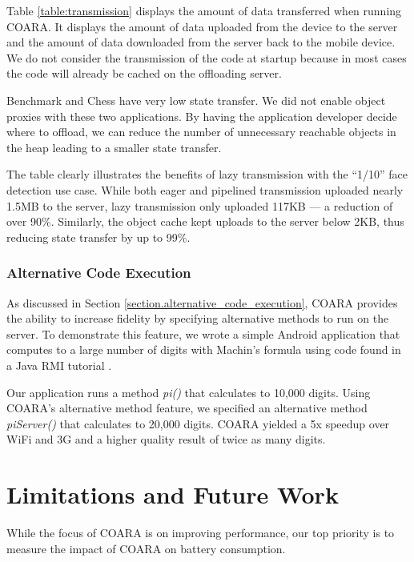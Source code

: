 \documentclass[10pt,journal,cspaper,compsoc]{IEEEtran}
\begin{document}
{Table \ref{table:transmission} displays the amount of data transferred when running COARA.  It displays the amount of data uploaded from the device to the server and the amount of data downloaded from the server back to the mobile device.  We do not consider the transmission of the code at startup because in most cases the code will already be cached on the offloading server.

Benchmark and Chess have very low state transfer.  We did not enable object proxies with these two applications.  By having the application developer decide where to offload, we can reduce the number of unnecessary reachable objects in the heap leading to a smaller state transfer.

The table clearly illustrates the benefits of lazy transmission with the ``1/10'' face detection use case.  While both eager and pipelined transmission uploaded nearly 1.5MB to the server, lazy transmission only uploaded 117KB --- a reduction of over 90\%.  Similarly, the object cache kept uploads to the server below 2KB, thus reducing state transfer by up to 99\%.



\subsubsection{Alternative Code Execution}


As discussed in Section \ref{section.alternative_code_execution}, COARA provides the ability to increase fidelity by specifying alternative methods to run on the server.  To demonstrate this feature, we wrote a simple Android application that computes  to a large number of digits with Machin's formula using code found in a Java RMI tutorial \cite{pi:Online}.

Our application runs a method \emph{pi()} that calculates  to 10,000 digits.  Using COARA's alternative method feature, we specified an alternative method \emph{piServer()} that calculates  to 20,000 digits.  COARA yielded a 5x speedup over WiFi and 3G and a higher quality result of twice as many digits.




\section{Limitations and Future Work}
\label{sec:limits}


While the focus of COARA is on improving performance, our top priority is to measure the impact of COARA on battery consumption.

}
\end{document}
